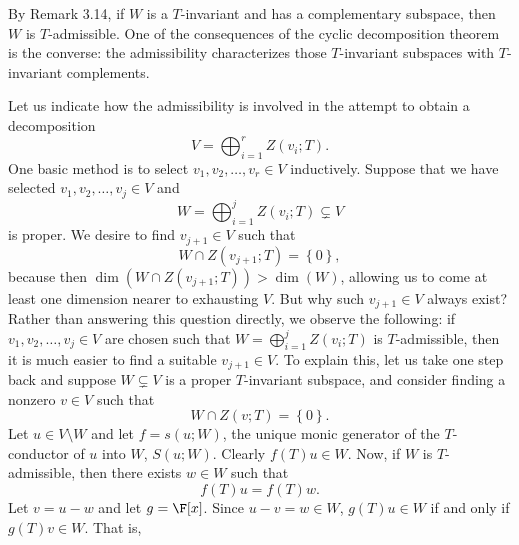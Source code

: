 \documentclass[math_245.tex]{subfiles}
\begin{document}
    \begin{remark}
        By Remark 3.14, if $W$ is a $T$-invariant and has a complementary subspace, then $W$ is $T$-admissible. One of the consequences of the cyclic decomposition theorem is the converse: the admissibility characterizes those $T$-invariant subspaces with $T$-invariant complements.
    \end{remark}

    \begin{remark}
        Let us indicate how the admissibility is involved in the attempt to obtain a decomposition
        \begin{equation*}
            V = \bigoplus^{r}_{i=1} Z(v_i;T).
        \end{equation*}
        One basic method is to select $v_1, v_2, \ldots, v_r\in V$ inductively. Suppose that we have selected $v_1, v_2, \ldots, v_j\in V$ and
        \begin{equation*}
            W = \bigoplus^{j}_{i=1} Z(v_i;T)\subsetneq V
        \end{equation*}
        is proper. We desire to find $v_{j+1}\in V$ such that
        \begin{equation*}
            W\cap Z(v_{j+1};T) = \left\lbrace 0 \right\rbrace ,
        \end{equation*}
        because then $\dim\left(W\cap Z(v_{j+1};T) \right) > \dim(W)$, allowing us to come at least one dimension nearer to exhausting $V$. But why such $v_{j+1}\in V$ always exist? Rather than answering this question directly, we observe the following: if $v_1, v_2,\ldots, v_j\in V$ are chosen such that $W=\bigoplus^{j}_{i=1} Z(v_i;T)$ is $T$-admissible, then it is much easier to find a suitable $v_{j+1}\in V$. To explain this, let us take one step back and suppose $W\subsetneq V$ is a proper $T$-invariant subspace, and consider finding a nonzero $v\in V$ such that
        \begin{equation*}
            W\cap Z(v;T) = \left\lbrace 0 \right\rbrace .
        \end{equation*}
        Let $u\in V\setminus W$ and let $f=s(u;W)$, the unique monic generator of the $T$-conductor of $u$ into $W$, $S(u;W)$. Clearly $f(T)u\in W$. Now, if $W$ is $T$-admissible, then there exists $w\in W$ such that
        \begin{equation*}
            f(T)u = f(T)w.
        \end{equation*}
        Let $v=u-w$ and let $g=\F[x]$. Since $u-v=w\in W$, $g(T)u\in W$ if and only if $g(T)v\in W$. That is,

\end{remark}
\end{document}
